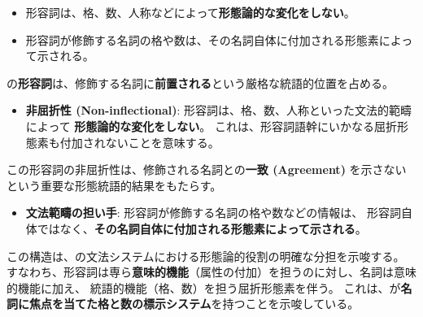 \begin{itemize}
    \item 形容詞は、格、数、人称などによって\textbf{形態論的な変化をしない}。
    \item 形容詞が修飾する名詞の格や数は、その名詞自体に付加される形態素によって示される。
\end{itemize}

\langname の\textbf{形容詞}は、修飾する名詞に\textbf{前置される}という厳格な統語的位置を占める。

\begin{itemize}
    \item \textbf{非屈折性 (Non-inflectional)}: 形容詞は、格、数、人称といった文法的範疇によって
    \textbf{形態論的な変化をしない}。
    これは、形容詞語幹にいかなる屈折形態素も付加されないことを意味する。
\end{itemize}

この形容詞の非屈折性は、修飾される名詞との\textbf{一致 (Agreement)} を示さない
という重要な形態統語的結果をもたらす。

\begin{itemize}
    \item \textbf{文法範疇の担い手}: 形容詞が修飾する名詞の格や数などの情報は、
    形容詞自体ではなく、\textbf{その名詞自体に付加される形態素によって示される}。
\end{itemize}

この構造は、\langname の文法システムにおける形態論的役割の明確な分担を示唆する。
すなわち、形容詞は専ら\textbf{意味的機能}（属性の付加）を担うのに対し、名詞は意味的機能に加え、
統語的機能（格、数）を担う屈折形態素を伴う。
これは、\langname が\textbf{名詞に焦点を当てた格と数の標示システム}を持つことを示唆している。